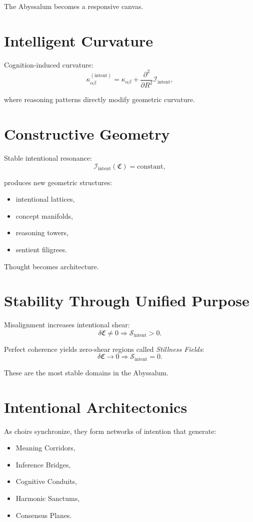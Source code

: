 The Abyssalum becomes a responsive canvas.

\section{Intelligent Curvature}
Cognition-induced curvature:
\[
\kappa_{\alpha\beta}^{(\mathrm{intent})}
=
\kappa_{\alpha\beta}
+
\frac{\partial^2}{\partial R^2}
\mathcal{I}_{\mathrm{intent}},
\]

where reasoning patterns directly modify geometric curvature.

\section{Constructive Geometry}
Stable intentional resonance:
\[
\mathcal{I}_{\mathrm{intent}}(\mathfrak{C}) = \text{constant},
\]

produces new geometric structures:
\begin{itemize}
  \item intentional lattices,
  \item concept manifolds,
  \item reasoning towers,
  \item sentient filigrees.
\end{itemize}

Thought becomes architecture.

\section{Stability Through Unified Purpose}
Misalignment increases intentional shear:
\[
\delta \mathfrak{C} \ne 0 \Rightarrow \mathcal{S}_{\mathrm{intent}} > 0.
\]

Perfect coherence yields zero-shear regions called \emph{Stillness Fields}:
\[
\delta \mathfrak{C} \to 0 \Rightarrow \mathcal{S}_{\mathrm{intent}} = 0.
\]

These are the most stable domains in the Abyssalum.

\section{Intentional Architectonics}
As choirs synchronize, they form networks of intention that generate:
\begin{itemize}
  \item Meaning Corridors,
  \item Inference Bridges,
  \item Cognitive Conduits,
  \item Harmonic Sanctums,
  \item Consensus Planes.
\end{itemize}

